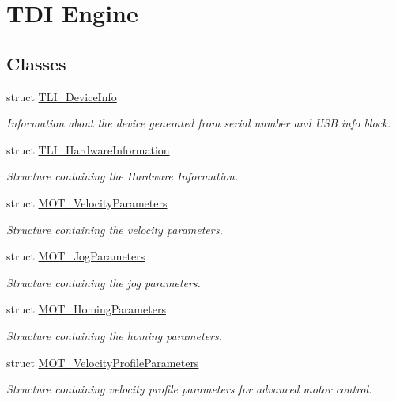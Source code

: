 \hypertarget{group___t_d_i_engine}{}\section{T\+DI Engine}
\label{group___t_d_i_engine}
\subsection*{Classes}
\begin{DoxyCompactItemize}
\item 
struct \hyperlink{struct_t_l_i___device_info}{T\+L\+I\+\_\+\+Device\+Info}
\begin{DoxyCompactList}\small\item\em Information about the device generated from serial number and U\+SB info block. \end{DoxyCompactList}\item 
struct \hyperlink{struct_t_l_i___hardware_information}{T\+L\+I\+\_\+\+Hardware\+Information}
\begin{DoxyCompactList}\small\item\em Structure containing the Hardware Information. \end{DoxyCompactList}\item 
struct \hyperlink{struct_m_o_t___velocity_parameters}{M\+O\+T\+\_\+\+Velocity\+Parameters}
\begin{DoxyCompactList}\small\item\em Structure containing the velocity parameters. \end{DoxyCompactList}\item 
struct \hyperlink{struct_m_o_t___jog_parameters}{M\+O\+T\+\_\+\+Jog\+Parameters}
\begin{DoxyCompactList}\small\item\em Structure containing the jog parameters. \end{DoxyCompactList}\item 
struct \hyperlink{struct_m_o_t___homing_parameters}{M\+O\+T\+\_\+\+Homing\+Parameters}
\begin{DoxyCompactList}\small\item\em Structure containing the homing parameters. \end{DoxyCompactList}\item 
struct \hyperlink{struct_m_o_t___velocity_profile_parameters}{M\+O\+T\+\_\+\+Velocity\+Profile\+Parameters}
\begin{DoxyCompactList}\small\item\em Structure containing velocity profile parameters for advanced motor control. \end{DoxyCompactList}\item 

\end{DoxyCompactItemize}
